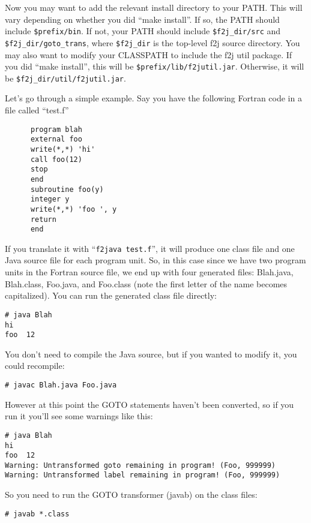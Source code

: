 \documentclass[11pt]{article}
\begin{document}
Now you may want to add the relevant install directory to your PATH.  This
will vary depending on whether you did ``make install''.  If so, the PATH
should include \verb|$prefix/bin|.  If not, your PATH should include
\verb|$f2j_dir/src| and \verb|$f2j_dir/goto_trans|, where \verb|$f2j_dir|
is the top-level f2j source directory.  You may also want to modify your 
CLASSPATH to include the f2j util package.
If you did ``make install'', this will be \verb|$prefix/lib/f2jutil.jar|.
Otherwise, it will be \verb|$f2j_dir/util/f2jutil.jar|.

Let's go through a simple example.  Say you have the following Fortran code in a file 
called ``test.f''

\begin{verbatim}
      program blah
      external foo
      write(*,*) 'hi'
      call foo(12)
      stop
      end
      subroutine foo(y)
      integer y
      write(*,*) 'foo ', y
      return
      end
\end{verbatim}

If you translate it with ``\verb|f2java test.f|'', it will produce one class file and
one Java source file for each program unit.  So, in this case since we have 
two program units in the Fortran source file, we end up with four generated files:
Blah.java, Blah.class, Foo.java, and Foo.class (note the first letter
of the name becomes
capitalized).  You can run the generated class file directly:

\begin{verbatim}
# java Blah
hi
foo  12
\end{verbatim}

You don't need to compile the Java source, but if you wanted to modify it,
you could recompile:

\begin{verbatim}
# javac Blah.java Foo.java
\end{verbatim}

However at this point the GOTO statements haven't been converted, so if you
run it you'll see some warnings like this:

\begin{verbatim}
# java Blah
hi
foo  12
Warning: Untransformed goto remaining in program! (Foo, 999999)
Warning: Untransformed label remaining in program! (Foo, 999999)
\end{verbatim}

So you need to run the GOTO transformer (javab) on the class files:

\begin{verbatim}
# javab *.class
\end{verbatim}
\end{document}
